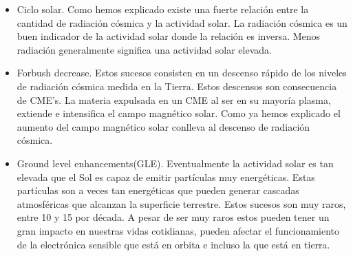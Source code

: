 \begin{itemize}
	\item	Ciclo solar. Como hemos explicado existe una fuerte relación entre la cantidad de radiación cósmica y la actividad solar. La radiación
		cósmica es un buen indicador de la actividad solar donde la relación es inversa. Menos radiación generalmente significa una actividad
		solar elevada.
	\item	Forbush decrease\cite{Forbush1938}. Estos sucesos consisten en un descenso rápido de los niveles de radiación cósmica medida en la
		Tierra. Estos descensos son consecuencia de CME's. La materia expulsada en un CME al ser en su mayoría plasma, extiende e intensifica
		el campo magnético solar. Como ya hemos explicado el aumento del campo magnético solar conlleva al descenso de radiación cósmica.
	\item	Ground level enhancements(GLE). Eventualmente la actividad solar es tan elevada que el Sol es capaz de emitir partículas muy energéticas.
		Estas partículas son a veces tan energéticas que pueden generar cascadas atmosféricas que alcanzan la superficie terrestre. Estos
		sucesos son muy raros, entre 10 y 15 por década. A pesar de ser muy raros estos pueden tener un gran impacto en nuestras vidas
		cotidianas, pueden afectar el funcionamiento de la electrónica sensible que está en orbita e incluso la que está en tierra.   
\end{itemize}

